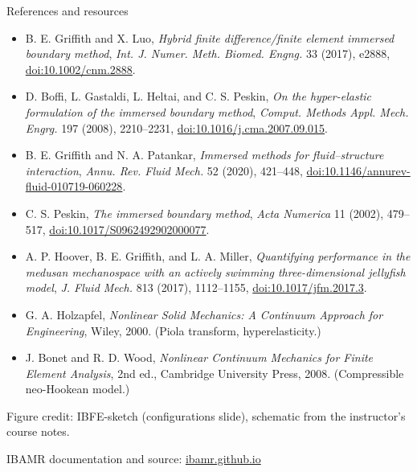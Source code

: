 \documentclass[aspectratio=169,11pt]{beamer}
\begin{document}
\begin{frame}{References and resources}
\scriptsize
\begin{itemize}\itemsep4pt
  \item B. E. Griffith and X. Luo, \emph{Hybrid finite difference/finite element immersed boundary method}, \emph{Int. J. Numer. Meth. Biomed. Engng.} 33 (2017), e2888, \href{https://doi.org/10.1002/cnm.2888}{doi:10.1002/cnm.2888}.
  \item D. Boffi, L. Gastaldi, L. Heltai, and C. S. Peskin, \emph{On the hyper-elastic formulation of the immersed boundary method}, \emph{Comput. Methods Appl. Mech. Engrg.} 197 (2008), 2210--2231, \href{https://doi.org/10.1016/j.cma.2007.09.015}{doi:10.1016/j.cma.2007.09.015}.
  \item B. E. Griffith and N. A. Patankar, \emph{Immersed methods for fluid--structure interaction}, \emph{Annu. Rev. Fluid Mech.} 52 (2020), 421--448, \href{https://doi.org/10.1146/annurev-fluid-010719-060228}{doi:10.1146/annurev-fluid-010719-060228}.
  \item C. S. Peskin, \emph{The immersed boundary method}, \emph{Acta Numerica} 11 (2002), 479--517, \href{https://doi.org/10.1017/S0962492902000077}{doi:10.1017/S0962492902000077}.
  \item A. P. Hoover, B. E. Griffith, and L. A. Miller, \emph{Quantifying performance in the medusan mechanospace with an actively swimming three-dimensional jellyfish model}, \emph{J. Fluid Mech.} 813 (2017), 1112--1155, \href{https://doi.org/10.1017/jfm.2017.3}{doi:10.1017/jfm.2017.3}.
  \item G. A. Holzapfel, \emph{Nonlinear Solid Mechanics: A Continuum Approach for Engineering}, Wiley, 2000. (Piola transform, hyperelasticity.)
  \item J. Bonet and R. D. Wood, \emph{Nonlinear Continuum Mechanics for Finite Element Analysis}, 2nd ed., Cambridge University Press, 2008. (Compressible neo-Hookean model.)
\end{itemize}
{\scriptsize\color{DarkGray}Figure credit: IBFE-sketch (configurations slide), schematic from the instructor's course notes.\par}
\medskip
\begin{punchbox}
\centering
\small IBAMR documentation and source: \href{https://ibamr.github.io}{ibamr.github.io}
\end{punchbox}
\end{frame}
\end{document}
